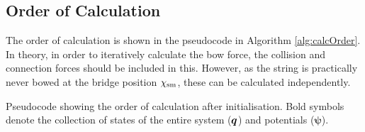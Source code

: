     \subsection{Order of Calculation} 
    The order of calculation is shown in the pseudocode in Algorithm \ref{alg:calcOrder}. In theory, in order to iteratively calculate the bow force, the collision and connection forces should be included in this. %
    However, as the string is practically never bowed at the bridge position $\chi_\text{sm}$, these can be calculated independently.
    \begin{algorithm}[ht]
    \centering
     \vspace{0.2cm}
     \caption{Pseudocode showing the order of calculation after initialisation. Bold symbols denote the collection of states of the entire system ($\boldsymbol{q}$) and potentials ($\boldsymbol{\psi}$). \label{alg:calcOrder}}
    \end{algorithm}
    
